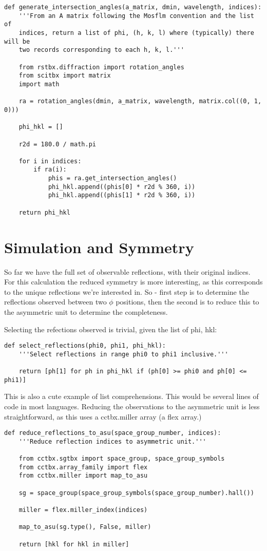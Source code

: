 \documentclass[a4paper, 11pt]{article}
\begin{document}
{\small
\begin{verbatim}
def generate_intersection_angles(a_matrix, dmin, wavelength, indices):
    '''From an A matrix following the Mosflm convention and the list of
    indices, return a list of phi, (h, k, l) where (typically) there will be
    two records corresponding to each h, k, l.'''

    from rstbx.diffraction import rotation_angles
    from scitbx import matrix
    import math

    ra = rotation_angles(dmin, a_matrix, wavelength, matrix.col((0, 1, 0)))

    phi_hkl = []

    r2d = 180.0 / math.pi

    for i in indices:
        if ra(i):
            phis = ra.get_intersection_angles()
            phi_hkl.append((phis[0] * r2d % 360, i))
            phi_hkl.append((phis[1] * r2d % 360, i))

    return phi_hkl
\end{verbatim}
}

\section{Simulation and Symmetry}

So far we have the full set of observable reflections, with their original indices. For this calculation the reduced symmetry is more interesting, as this corresponds to the unique reflections we're interested in. So - first step is to determine the reflections observed between two $\phi$ positions, then the second is to reduce this to the asymmetric unit to determine the completeness.

Selecting the refections observed is trivial, given the list of phi, hkl:

{\small
\begin{verbatim}
def select_reflections(phi0, phi1, phi_hkl):
    '''Select reflections in range phi0 to phi1 inclusive.'''

    return [ph[1] for ph in phi_hkl if (ph[0] >= phi0 and ph[0] <= phi1)]
\end{verbatim}
}

This is also a cute example of list comprehensions. This would be several lines of code in most languages. Reducing the observations to the asymmetric unit is less straightforward, as this uses a cctbx.miller array (a flex array.)

{\small
\begin{verbatim}
def reduce_reflections_to_asu(space_group_number, indices):
    '''Reduce reflection indices to asymmetric unit.'''

    from cctbx.sgtbx import space_group, space_group_symbols
    from cctbx.array_family import flex
    from cctbx.miller import map_to_asu

    sg = space_group(space_group_symbols(space_group_number).hall())

    miller = flex.miller_index(indices)

    map_to_asu(sg.type(), False, miller)

    return [hkl for hkl in miller]
\end{verbatim}
}
\end{document}
